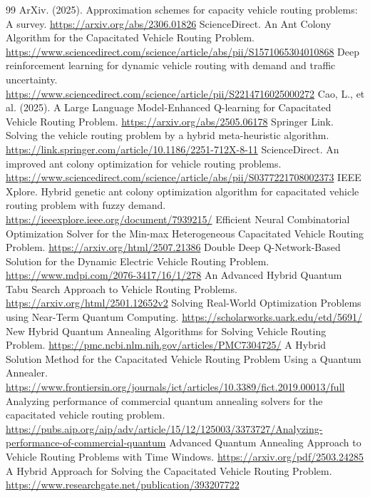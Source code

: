 \documentclass[a4paper, 11pt]{article}
\begin{document}
\begin{thebibliography}{99}
 ArXiv. (2025). Approximation schemes for capacity vehicle routing problems: A survey. \url{https://arxiv.org/abs/2306.01826}
 ScienceDirect. An Ant Colony Algorithm for the Capacitated Vehicle Routing Problem. \url{https://www.sciencedirect.com/science/article/abs/pii/S1571065304010868}
 Deep reinforcement learning for dynamic vehicle routing with demand and traffic uncertainty. \url{https://www.sciencedirect.com/science/article/pii/S2214716025000272}
 Cao, L., et al. (2025). A Large Language Model-Enhanced Q-learning for Capacitated Vehicle Routing Problem. \url{https://arxiv.org/abs/2505.06178}
 Springer Link. Solving the vehicle routing problem by a hybrid meta-heuristic algorithm. \url{https://link.springer.com/article/10.1186/2251-712X-8-11}
 ScienceDirect. An improved ant colony optimization for vehicle routing problems. \url{https://www.sciencedirect.com/science/article/abs/pii/S0377221708002373}
 IEEE Xplore. Hybrid genetic ant colony optimization algorithm for capacitated vehicle routing problem with fuzzy demand. \url{https://ieeexplore.ieee.org/document/7939215/}
 Efficient Neural Combinatorial Optimization Solver for the Min-max Heterogeneous Capacitated Vehicle Routing Problem. \url{https://arxiv.org/html/2507.21386}
 Double Deep Q-Network-Based Solution for the Dynamic Electric Vehicle Routing Problem. \url{https://www.mdpi.com/2076-3417/16/1/278}
 An Advanced Hybrid Quantum Tabu Search Approach to Vehicle Routing Problems. \url{https://arxiv.org/html/2501.12652v2}
 Solving Real-World Optimization Problems using Near-Term Quantum Computing. \url{https://scholarworks.uark.edu/etd/5691/}
 New Hybrid Quantum Annealing Algorithms for Solving Vehicle Routing Problem. \url{https://pmc.ncbi.nlm.nih.gov/articles/PMC7304725/}
 A Hybrid Solution Method for the Capacitated Vehicle Routing Problem Using a Quantum Annealer. \url{https://www.frontiersin.org/journals/ict/articles/10.3389/fict.2019.00013/full}
 Analyzing performance of commercial quantum annealing solvers for the capacitated vehicle routing problem. \url{https://pubs.aip.org/aip/adv/article/15/12/125003/3373727/Analyzing-performance-of-commercial-quantum}
 Advanced Quantum Annealing Approach to Vehicle Routing Problems with Time Windows. \url{https://arxiv.org/pdf/2503.24285}
 A Hybrid Approach for Solving the Capacitated Vehicle Routing Problem. \url{https://www.researchgate.net/publication/393207722}

\end{thebibliography}
\end{document}

